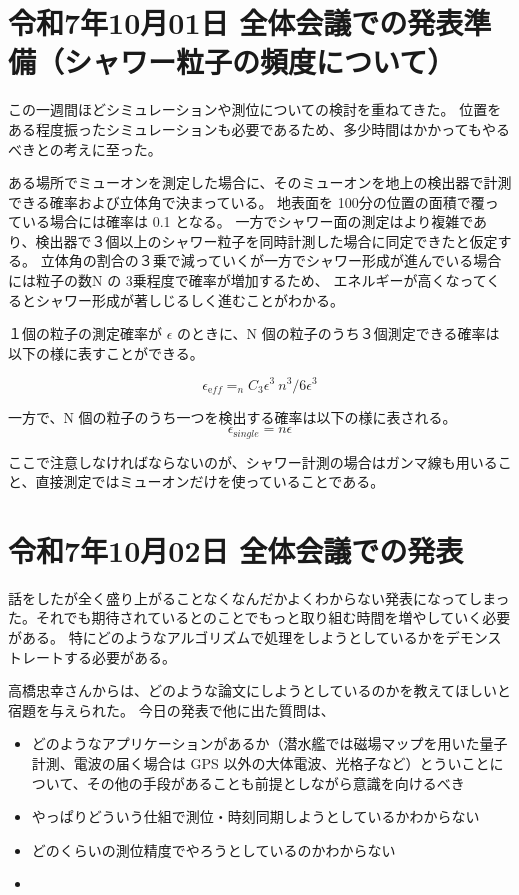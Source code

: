 \section{令和7年10月01日 全体会議での発表準備（シャワー粒子の頻度について）}
\label{sec:diary-20251001}

この一週間ほどシミュレーションや測位についての検討を重ねてきた。
位置をある程度振ったシミュレーションも必要であるため、多少時間はかかってもやるべきとの考えに至った。

ある場所でミューオンを測定した場合に、そのミューオンを地上の検出器で計測できる確率および立体角で決まっている。
地表面を 100分の位置の面積で覆っている場合には確率は 0.1 となる。
一方でシャワー面の測定はより複雑であり、検出器で３個以上のシャワー粒子を同時計測した場合に同定できたと仮定する。
立体角の割合の３乗で減っていくが一方でシャワー形成が進んでいる場合には粒子の数N の 3乗程度で確率が増加するため、
エネルギーが高くなってくるとシャワー形成が著しじるしく進むことがわかる。

１個の粒子の測定確率が $\epsilon$ のときに、N 個の粒子のうち３個測定できる確率は以下の様に表すことができる。

\begin{equation}
  \epsilon_{\mathrm eff} = _{n}C_{3} \epsilon^3 ~ n^3/6 \epsilon^3
\end{equation}

一方で、N 個の粒子のうち一つを検出する確率は以下の様に表される。
\begin{equation}
  \epsilon_{\mathrm single} = n \epsilon
\end{equation}

ここで注意しなければならないのが、シャワー計測の場合はガンマ線も用いること、直接測定ではミューオンだけを使っていることである。


\section{令和7年10月02日 全体会議での発表}
\label{sec:diary-20251002}

話をしたが全く盛り上がることなくなんだかよくわからない発表になってしまった。それでも期待されているとのことでもっと取り組む時間を増やしていく必要がある。
特にどのようなアルゴリズムで処理をしようとしているかをデモンストレートする必要がある。

高橋忠幸さんからは、どのような論文にしようとしているのかを教えてほしいと宿題を与えられた。
今日の発表で他に出た質問は、
\begin{itemize}
  \item どのようなアプリケーションがあるか（潜水艦では磁場マップを用いた量子計測、電波の届く場合は GPS 以外の大体電波、光格子など）とういことについて、その他の手段があることも前提としながら意識を向けるべき
  \item やっぱりどういう仕組で測位・時刻同期しようとしているかわからない
  \item どのくらいの測位精度でやろうとしているのかわからない
  \item 
\end{itemize}

